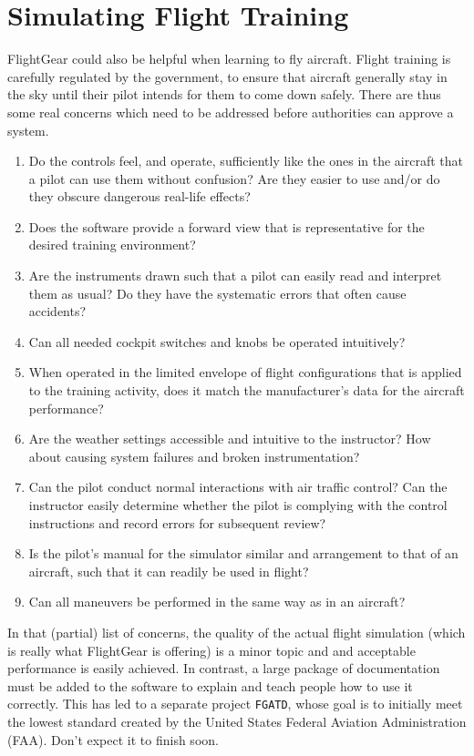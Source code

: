 \documentclass[a4paper,10pt]{article}
\begin{document}
\section*{Simulating Flight Training}
%
FlightGear could also be helpful when learning to fly aircraft.
Flight training is carefully regulated by the government, to
ensure that aircraft generally stay in the sky until their pilot intends
for them to come down safely.  There are thus some real concerns
which need to be addressed before authorities can approve a system.
%
\begin{enumerate}
%
\item Do the controls feel, and operate, sufficiently like the
ones in the aircraft that a pilot can use them without confusion?
Are they easier to use and/or do they obscure dangerous real-life effects?
%
\item Does the software provide a forward view that is representative
for the desired training environment?
%
\item Are the instruments drawn
such that a pilot can easily read and interpret them as usual?
Do they have the systematic errors that often cause accidents?
%
\item Can all needed cockpit switches and knobs be operated intuitively?
%
\item When operated in the limited envelope of flight configurations
that is applied to the training activity, does it match the
manufacturer's data for the aircraft performance?
%
\item Are the weather settings accessible and intuitive to the instructor?
How about causing system failures and broken instrumentation?
%
\item Can the pilot conduct normal interactions with air traffic control?
Can the instructor easily determine whether the pilot is complying
with the control instructions and record errors for subsequent review?
%
\item Is the pilot's manual for the simulator similar and arrangement
to that of an aircraft, such that it can readily be used in flight?
%
\item Can all maneuvers be performed in the same way as in an aircraft?
%
\end{enumerate}
%
In that (partial) list of concerns, the quality of the actual
flight simulation (which is really what FlightGear is offering)
is a minor topic and and acceptable performance is easily achieved.
In contrast, a large package of documentation must be added to the
software to explain and teach people how to use it correctly.
This has led to a separate project {\tt FGATD}\cite{fgatd},
whose goal is to
initially meet the lowest standard created by the United States
Federal Aviation Administration (FAA).  Don't expect it to finish soon.
\end{document}
